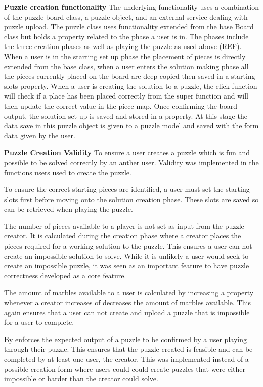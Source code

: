 \documentclass{l4proj}
\begin{document}
\textbf{Puzzle creation functionality}
The underlying functionality uses a combination of the puzzle board class, a puzzle object, and an external service dealing with puzzle upload. The puzzle class uses functionality extended from the base Board class but holds a property related to the phase a user is in. The phases include the three creation phases as well as playing the puzzle as used above (REF). When a user is in the starting set up phase the placement of pieces is directly extended from the base class, when a user enters the solution making phase all the pieces currently placed on the board are deep copied then saved in a starting slots property. When a user is creating the solution to a puzzle, the click function will check if a place has been placed correctly from the super function and will then update the correct value in the piece map. Once confirming the board output, the solution set up is saved and stored in a property. At this stage the data save in this puzzle object is given to a puzzle model and saved with the form data given by the user.

\textbf{Puzzle Creation Validity}
To ensure a user creates a puzzle which is fun and possible to be solved correctly by an anther user. Validity was implemented in the functions users used to create the puzzle.

To ensure the correct starting pieces are identified, a user must set the starting slots first before moving onto the solution creation phase. These slots are saved so can be retrieved when playing the puzzle.

The number of pieces available to a player is not set as input from the puzzle creator. It is calculated during the creation phase where a creator places the pieces required for a working solution to the puzzle. This ensures a user can not create an impossible solution to solve. While it is unlikely a user would seek to create an impossible puzzle, it was seen as an important feature to have puzzle correctness developed as a core feature. 

The amount of marbles available to a user is calculated by increasing a property whenever a creator increases of decreases the amount of marbles available. This again ensures that a user can not create and upload a puzzle that is impossible for a user to complete. 

By enforces the expected output of a puzzle to be confirmed by a user playing through their puzzle. This ensures that the puzzle created is feasible and can be completed by at least one user, the creator. This was implemented instead of a possible creation form where users could could create puzzles that were either impossible or harder than the creator could solve.
\end{document}
